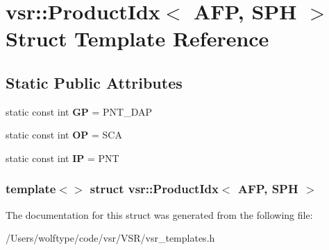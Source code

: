 \hypertarget{structvsr_1_1_product_idx_3_01_a_f_p_00_01_s_p_h_01_4}{\section{vsr\-:\-:Product\-Idx$<$ A\-F\-P, S\-P\-H $>$ Struct Template Reference}
\label{structvsr_1_1_product_idx_3_01_a_f_p_00_01_s_p_h_01_4}
}
\subsection*{Static Public Attributes}
\begin{DoxyCompactItemize}
\item 
\hypertarget{structvsr_1_1_product_idx_3_01_a_f_p_00_01_s_p_h_01_4_a3e38c895b73c33b48aa9c2e1e7d9bb22}{static const int {\bfseries G\-P} = P\-N\-T\-\_\-\-D\-A\-P}\label{structvsr_1_1_product_idx_3_01_a_f_p_00_01_s_p_h_01_4_a3e38c895b73c33b48aa9c2e1e7d9bb22}

\item 
\hypertarget{structvsr_1_1_product_idx_3_01_a_f_p_00_01_s_p_h_01_4_a954f1741600286999871bf845a5ca992}{static const int {\bfseries O\-P} = S\-C\-A}\label{structvsr_1_1_product_idx_3_01_a_f_p_00_01_s_p_h_01_4_a954f1741600286999871bf845a5ca992}

\item 
\hypertarget{structvsr_1_1_product_idx_3_01_a_f_p_00_01_s_p_h_01_4_af571533cbac45b423bcc6483dfb9def2}{static const int {\bfseries I\-P} = P\-N\-T}\label{structvsr_1_1_product_idx_3_01_a_f_p_00_01_s_p_h_01_4_af571533cbac45b423bcc6483dfb9def2}

\end{DoxyCompactItemize}
\subsubsection*{template$<$$>$ struct vsr\-::\-Product\-Idx$<$ A\-F\-P, S\-P\-H $>$}



The documentation for this struct was generated from the following file\-:\begin{DoxyCompactItemize}
\item 
/\-Users/wolftype/code/vsr/\-V\-S\-R/vsr\-\_\-templates.\-h\end{DoxyCompactItemize}
